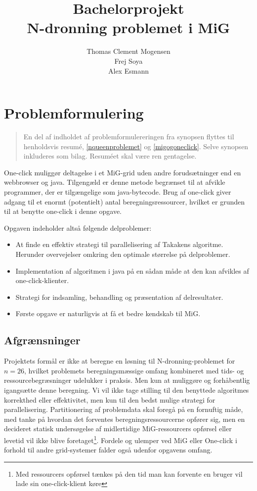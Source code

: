 \documentclass[final,a4paper,10pt]{article}
\title{Bachelorprojekt\\N-dronning problemet i MiG}
\author{Thomas Clement Mogensen \\ Frej Soya \\ Alex Esmann }
\begin{document}
\maketitle
\tableofcontents

\newpage
\setcounter{page}{1}
\section{Problemformulering}\label{problemformulering}
\begin{verse}
	En del af indholdet af problemformulereringen fra synopsen flyttes til henholdsvis resumé, \ref{nqueenproblemet} og \ref{migogoneclick}. Selve synopsen inkluderes som bilag. Resuméet skal være ren gentagelse.
\end{verse}
%

One-click muliggør deltagelse i et MiG-grid uden andre forudsætninger end en webbrowser og java. Tilgengæld er denne metode begrænset til at afvikle programmer, der er tilgængelige som java-bytecode. Brug af one-click giver adgang til et enormt (potentielt) antal beregningsressourcer, hvilket er grunden til at benytte one-click i denne opgave.

 Opgaven indeholder altså følgende delproblemer:
\begin{itemize}
\item At finde en effektiv strategi til parallelisering af Takakens algoritme. Herunder overvejelser omkring den optimale størrelse på delproblemer.
\item Implementation af algoritmen i java på en sådan måde at den kan afvikles af one-click-klienter.
\item Strategi for indsamling, behandling og præsentation af delresultater.
\item Første opgave er naturligvis at få et bedre kendskab til MiG.
\end{itemize}

\subsection{Afgrænsninger}\label{afgraensninger}
%

Projektets formål er ikke at beregne en løsning til N-dronning-problemet for $n=26$, hvilket problemets beregningsmæssige omfang kombineret med tids- og ressourcebegræsninger udelukker i praksis. Men kun at muliggøre og forhåbentlig igangsætte denne beregning.
Vi vil ikke tage stilling til den benyttede algoritmes korrekthed eller effektivitet, men kun til den bedst mulige strategi for parallelisering. Partitionering af problemdata skal foregå på en fornuftig måde, med tanke på hvordan det forventes beregningsressourcerne opfører sig, men en decideret statisk undersøgelse af midlertidige MiG-ressourcers opførsel eller levetid vil ikke blive foretaget\footnote{Med ressourcers opførsel tænkes på den tid man kan forvente en bruger vil lade sin one-click-klient køre}. Fordele og ulemper ved MiG eller One-click i forhold til andre grid-systemer falder også udenfor opgavens omfang.
\end{document}

